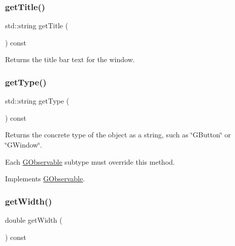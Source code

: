 \mbox{\label{classGWindow_abc7651e67987c4682fed77d92a860bba}} 
\subsubsection{\texorpdfstring{get\+Title()}{getTitle()}}
{\footnotesize\ttfamily std\+::string get\+Title (\begin{DoxyParamCaption}{ }\end{DoxyParamCaption}) const\hspace{0.3cm}{\ttfamily [virtual]}}



Returns the title bar text for the window. 

\mbox{\label{classGWindow_a9896d58fcfebbf1025aeeb5b8b9ede80}} 
\subsubsection{\texorpdfstring{get\+Type()}{getType()}}
{\footnotesize\ttfamily std\+::string get\+Type (\begin{DoxyParamCaption}{ }\end{DoxyParamCaption}) const\hspace{0.3cm}{\ttfamily [virtual]}}



Returns the concrete type of the object as a string, such as {\ttfamily \char`\"{}\+G\+Button\char`\"{}} or {\ttfamily \char`\"{}\+G\+Window\char`\"{}}. 

Each \mbox{\hyperlink{classGObservable}{G\+Observable}} subtype must override this method. 

Implements \mbox{\hyperlink{classGObservable_a799e073a127b428cc841086d42ea4fed}{G\+Observable}}.

\mbox{\label{classGWindow_a0ed2965abd4f5701d2cadf71239faf19}} 
\subsubsection{\texorpdfstring{get\+Width()}{getWidth()}}
{\footnotesize\ttfamily double get\+Width (\begin{DoxyParamCaption}{ }\end{DoxyParamCaption}) const\hspace{0.3cm}{\ttfamily [virtual]}}



